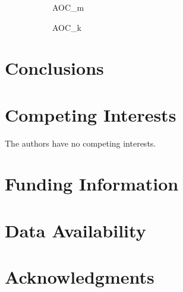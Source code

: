 \documentclass[12pt, oneside]{article}   	%
\begin{document}
\begin{figure}[H]
\centering
\begin{subfigure}[t]{0.48\textwidth}
\centering
\caption{AOC\_m}
\end{subfigure}
\hfill
\begin{subfigure}[t]{0.48\textwidth}
\centering
\caption{AOC\_k}
\end{subfigure}
\caption{}
\label{fig:overlapping}
\end{figure}
		
\section{Conclusions}
	
\section*{Competing Interests} \vspace{3mm} The authors have no competing interests. 
	
\section*{Funding Information} 
	
\section*{Data Availability} 
	
\section*{Acknowledgments} 



\end{document}
